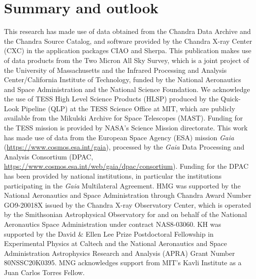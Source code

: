 \documentclass[linenumbers]{aastex631}
\begin{document}
\section{Summary and outlook}
\label{sec:summary}

\begin{acknowledgements}
This research has made use of data obtained from the Chandra Data Archive and the Chandra Source Catalog, and software provided by the Chandra X-ray Center (CXC) in the application packages CIAO and Sherpa. This publication makes use of data products from the Two Micron All Sky Survey, which is a joint project of the University of Massachusetts and the Infrared Processing and Analysis Center/California Institute of Technology, funded by the National Aeronautics and Space Administration and the National Science Foundation. We acknowledge the use of TESS High Level Science Products (HLSP) produced by the Quick-Look Pipeline (QLP) at the TESS Science Office at MIT, which are publicly available from the Mikulski Archive for Space Telescopes (MAST). Funding for the TESS mission is provided by NASA's Science Mission directorate.
This work has made use of data from the European Space Agency (ESA) mission {\it Gaia} (\url{https://www.cosmos.esa.int/gaia}), processed by the {\it Gaia} Data Processing and Analysis Consortium (DPAC, \url{https://www.cosmos.esa.int/web/gaia/dpac/consortium}). Funding for the DPAC has been provided by national institutions, in particular the institutions participating in the {\it Gaia} Multilateral Agreement.
HMG was supported by the National Aeronautics and Space Administration through Chandra Award Number GO9-20018X issued by the Chandra X-ray Observatory Center, which is operated by the Smithsonian Astrophysical Observatory for and on behalf of the National Aeronautics Space Administration under contract NAS8-03060. 
KH was supported by the David {\&} Ellen Lee Prize Postdoctoral Fellowship in Experimental Physics at Caltech and the National Aeronautics and Space Administration Astrophysics Research and Analysis (APRA) Grant Number 80NSSC20K0395.
MNG acknowledges support from MIT's Kavli Institute as a Juan Carlos Torres Fellow.
\end{acknowledgements}



{}



\end{document}
